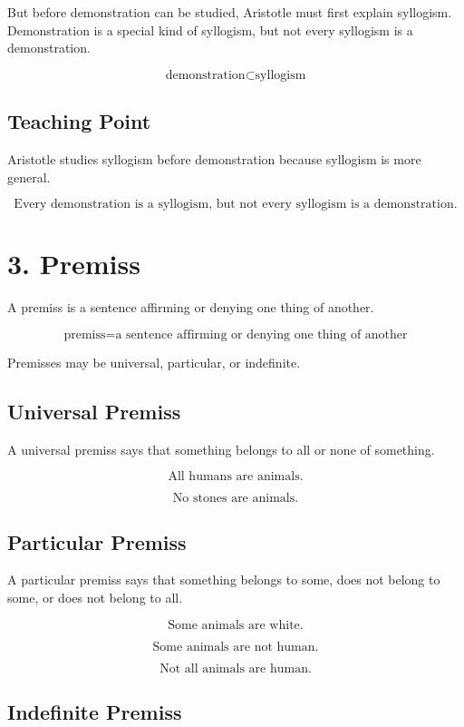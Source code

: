 \documentclass[12pt]{article}
\begin{document}
But before demonstration can be studied, Aristotle must first explain
syllogism. Demonstration is a special kind of syllogism, but not every
syllogism is a demonstration.

\[
\text{demonstration} \subset \text{syllogism}
\]

\subsection*{Teaching Point}

Aristotle studies syllogism before demonstration because syllogism is more
general.

\[
\boxed{
\text{Every demonstration is a syllogism, but not every syllogism is a demonstration.}
}
\]

\section*{3. Premiss}

A premiss is a sentence affirming or denying one thing of another.

\[
\boxed{
\text{premiss} = \text{a sentence affirming or denying one thing of another}
}
\]

Premisses may be universal, particular, or indefinite.

\subsection*{Universal Premiss}

A universal premiss says that something belongs to all or none of something.

\[
\text{All humans are animals.}
\]

\[
\text{No stones are animals.}
\]

\subsection*{Particular Premiss}

A particular premiss says that something belongs to some, does not belong to
some, or does not belong to all.

\[
\text{Some animals are white.}
\]

\[
\text{Some animals are not human.}
\]

\[
\text{Not all animals are human.}
\]

\subsection*{Indefinite Premiss}
\end{document}
